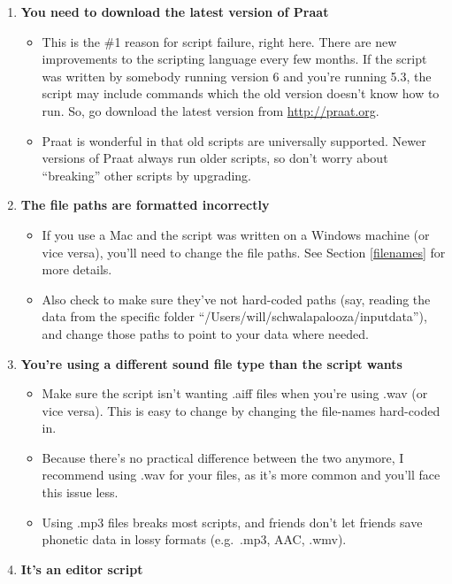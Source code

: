\begin{enumerate}
\def\labelenumi{\arabic{enumi}.}
\tightlist
\item
  \textbf{You need to download the latest version of Praat}

  \begin{itemize}
  \tightlist
  \item
    This is the \#1 reason for script failure, right here. There are new
    improvements to the scripting language every few months. If the
    script was written by somebody running version 6 and you're running
    5.3, the script may include commands which the old version doesn't
    know how to run. So, go download the latest version from
    \url{http://praat.org}.
  \item
    Praat is wonderful in that old scripts are universally supported.
    Newer versions of Praat always run older scripts, so don't worry
    about ``breaking'' other scripts by upgrading.
  \end{itemize}
\item
  \textbf{The file paths are formatted incorrectly}

  \begin{itemize}
  \tightlist
  \item
    If you use a Mac and the script was written on a Windows machine (or
    vice versa), you'll need to change the file paths. See Section
    \ref{filenames} for more details.
  \item
    Also check to make sure they've not hard-coded paths (say, reading
    the data from the specific folder
    ``/Users/will/schwalapalooza/inputdata''), and change those paths to
    point to your data where needed.
  \end{itemize}
\item
  \textbf{You're using a different sound file type than the script
  wants}

  \begin{itemize}
  \tightlist
  \item
    Make sure the script isn't wanting .aiff files when you're using
    .wav (or vice versa). This is easy to change by changing the
    file-names hard-coded in.
  \item
    Because there's no practical difference between the two anymore, I
    recommend using .wav for your files, as it's more common and you'll
    face this issue less.
  \item
    Using .mp3 files breaks most scripts, and friends don't let friends
    save phonetic data in lossy formats (e.g.~.mp3, AAC, .wmv).
  \end{itemize}
\item
  \textbf{It's an editor script}


\end{enumerate}
